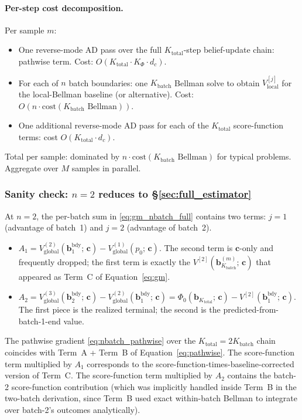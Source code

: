 \documentclass[11pt,a4paper]{article}
\newcommand{\bc}{\bm{c}}
\newcommand{\bb}{\bm{b}}
\begin{document}
\paragraph{Per-step cost decomposition.}  Per sample $m$:
\begin{itemize}[nosep, leftmargin=2em]
\item One reverse-mode AD pass over the full $K_\mathrm{total}$-step belief-update chain:
      pathwise term.  Cost: $O(K_\mathrm{total} \cdot K_\Phi \cdot d_c)$.
\item For each of $n$ batch boundaries: one $K_\mathrm{batch}$ Bellman solve to obtain
      $V^{[j]}_\mathrm{local}$ for the local-Bellman baseline (or alternative).  Cost:
      $O(n \cdot \mathrm{cost}(K_\mathrm{batch} \text{ Bellman}))$.
\item One additional reverse-mode AD pass for each of the $K_\mathrm{total}$ score-function
      terms: cost $O(K_\mathrm{total} \cdot d_c)$.
\end{itemize}
Total per sample: dominated by $n \cdot \mathrm{cost}(K_\mathrm{batch} \text{ Bellman})$ for
typical problems.  Aggregate over $M$ samples in parallel.

\subsubsection{Sanity check: \texorpdfstring{$n = 2$}{n=2} reduces to \S\ref{sec:full_estimator}}

At $n = 2$, the per-batch sum in \eqref{eq:gm_nbatch_full} contains two terms:
$j = 1$ (advantage of batch~1) and $j = 2$ (advantage of batch~2).
\begin{itemize}[nosep, leftmargin=2em]
\item $A_1 = V_{\mathrm{global}}^{(2)}(\bb^{\mathrm{bdy}}_1;\, \bc) - V_{\mathrm{global}}^{(1)}(p_0;\, \bc)$.
      The second term is $\bc$-only and frequently dropped; the first term is exactly the
      $V^{[2]}(\bb_{K_\mathrm{batch}}^{(m)};\, \bc)$ that appeared as Term~C of
      Equation~\eqref{eq:gm}.
\item $A_2 = V_{\mathrm{global}}^{(3)}(\bb^{\mathrm{bdy}}_2;\, \bc) - V_{\mathrm{global}}^{(2)}(\bb^{\mathrm{bdy}}_1;\, \bc) = \Phi_0(\bb_{K_\mathrm{total}};\, \bc) - V^{[2]}(\bb^{\mathrm{bdy}}_1;\, \bc)$.
      The first piece is the realized terminal; the second is the predicted-from-batch-1-end value.
\end{itemize}
The pathwise gradient \eqref{eq:nbatch_pathwise} over the $K_\mathrm{total} = 2 K_\mathrm{batch}$
chain coincides with Term~A + Term~B of Equation~\eqref{eq:pathwise}.  The score-function term
multiplied by $A_1$ corresponds to the score-function-times-baseline-corrected version of
Term~C.  The score-function term multiplied by $A_2$ contains the batch-2 score-function
contribution (which was implicitly handled inside Term~B in the two-batch derivation, since
Term~B used exact within-batch Bellman to integrate over batch-2's outcomes analytically).
\end{document}
